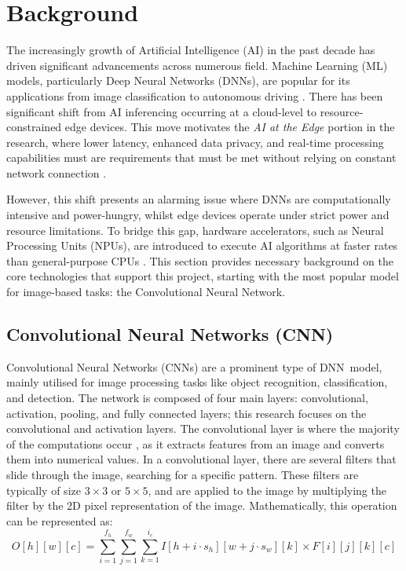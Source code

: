 \documentclass[12pt, a4paper, ukenglish]{article}
\begin{document}
\section{Background} \label{sec: background}
    The increasingly growth of Artificial Intelligence (AI) in the past decade has driven significant advancements across numerous field. Machine Learning (ML) models, particularly Deep Neural Networks (DNNs), are popular for its applications from image classification to autonomous driving \cite{parashar_scnn_2017}. There has been significant shift from AI inferencing occurring at a cloud-level to resource-constrained edge devices. This move motivates the \textit{AI at the Edge} portion in the research, where lower latency, enhanced data privacy, and real-time processing capabilities must are requirements that must be met without relying on constant network connection \cite{kim_energy-efficient_2020}.

    However, this shift presents an alarming issue where DNNs are computationally intensive and power-hungry, whilst edge devices operate under strict power and resource limitations. To bridge this gap, hardware accelerators, such as Neural Processing Units (NPUs), are introduced to execute AI algorithms at faster rates than general-purpose CPUs \cite{manor_custom_2022}. This section provides necessary background on the core technologies that support this project, starting with the most popular model for image-based tasks: the Convolutional Neural Network.

    \subsection{Convolutional Neural Networks (CNN)} \label{sec:CNN}
    Convolutional Neural Networks (CNNs) are a prominent type of DNN~model, mainly utilised for image processing tasks like object recognition, classification, and detection. The network is composed of four main layers: convolutional, activation, pooling, and fully connected layers; this research focuses on the convolutional and activation layers. The convolutional layer is where the majority of the computations occur \cite{choi_enabling_2023}, as it extracts features from an image and converts them into numerical values. In a convolutional layer, there are several filters that slide through the image, searching for a specific pattern. These filters are typically of size $3\times3$ or $5\times5$, and are applied to the image by multiplying the filter by the 2D pixel representation of the image. Mathematically, this operation can be represented as:
    \[
    O[h][w][c] = \sum_{i=1}^{f_h} \sum_{j=1}^{f_w} \sum_{k=1}^{i_c} I[h + i \cdot s_h][w + j \cdot s_w][k] \times F[i][j][k][c]
    \]
\end{document}
